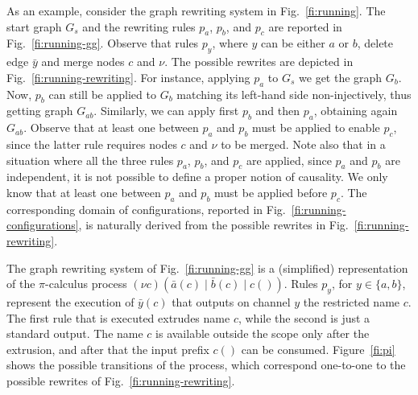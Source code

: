\documentclass[conference]{IEEEtran}
\begin{document}
As an example, consider the graph rewriting system in
Fig.~\ref{fi:running}.
%
The start graph $G_s$ and the rewriting rules $p_a$, $p_b$, and $p_c$
are reported in Fig.~\ref{fi:running-gg}.  Observe that rules $p_y$,
where $y$ can be either $a$ or $b$, delete edge $\bar{y}$ and merge
nodes $c$ and $\nu$. The possible rewrites are depicted in
Fig.~\ref{fi:running-rewriting}. For instance, applying $p_a$ to $G_s$
we get the graph $G_b$. Now, $p_b$ can still be applied to $G_b$
matching its left-hand side non-injectively, thus getting graph
$G_{ab}$. Similarly, we can apply first $p_b$ and then $p_a$,
obtaining again $G_{ab}$. Observe that at least one between $p_a$ 
and $p_b$ must be applied to enable $p_c$, since the latter rule requires 
nodes $c$ and $\nu$ to be merged.
%
{Note also} that in a situation where all the three rules $p_a$, $p_b$, and
$p_c$ are applied, since $p_a$ and $p_b$ are independent,
it is not possible to define a proper notion of causality. We only
know that at least one between $p_a$ and $p_b$ must be applied  
before $p_c$.
%
The corresponding domain of configurations, reported in
Fig.~\ref{fi:running-configurations}, is naturally derived from the
possible rewrites in Fig.~\ref{fi:running-rewriting}. 


The graph rewriting system of Fig.~\ref{fi:running-gg} is a (simplified) representation of the
$\pi$-calculus process $(\nu c)(\bar{a}(c) \mid \bar{b}(c) \mid
c())$. Rules $p_y$, for $y \in \{a,b\}$, represent the execution of
$\bar{y}(c)$ that outputs on channel $y$ the restricted name $c$. The
first rule that is executed extrudes name $c$, while the second is just a standard
output. The name $c$ is available outside the scope only after the extrusion, and 
after that the input prefix $c()$ can be consumed. {Figure~\ref{fi:pi} shows the possible transitions of the process, which correspond one-to-one to the possible rewrites of  Fig.~\ref{fi:running-rewriting}.}
\end{document}
